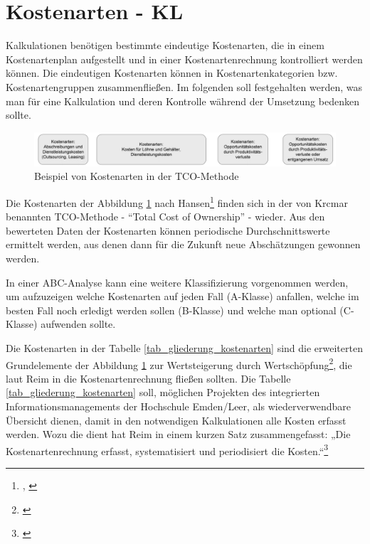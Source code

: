 
\section{Kostenarten - KL}

\label{section_kostenarten}
Kalkulationen benötigen bestimmte eindeutige Kostenarten, die in einem Kostenartenplan aufgestellt und in einer Kostenartenrechnung kontrolliert werden können. Die eindeutigen Kostenarten können in Kostenartenkategorien bzw. Kostenartengruppen zusammenfließen. Im folgenden soll festgehalten werden, was man für eine Kalkulation und deren Kontrolle w\"ahrend der Umsetzung bedenken sollte.

\begin{figure}[h!]
	\centering
	\includegraphics[width=\textwidth]{kapitel/gruppe4_2/bilder/beispiel_kostenarten_TCO}
	\caption{Beispiel von Kostenarten in der TCO-Methode}
	\label{fig_kostenarten_TCO}
\end{figure}

Die Kostenarten der Abbildung \ref{fig_kostenarten_TCO} nach Hansen\footnote{\autocite[495]{hansen_business_2009}, \autocite[Vgl.][314, 355]{muller2013betriebswirtschaftslehre}} finden sich in der von Krcmar benannten TCO-Methode - \enquote{Total Cost of Ownership} - wieder. Aus den bewerteten Daten der Kostenarten können periodische Durchschnittswerte ermittelt werden, aus denen dann für die Zukunft neue Abschätzungen gewonnen werden.

\clearpage

In einer ABC-Analyse kann eine weitere Klassifizierung vorgenommen werden, um aufzuzeigen welche Kostenarten auf jeden Fall (A-Klasse) anfallen, welche im besten Fall noch erledigt werden sollen (B-Klasse) und welche man optional (C-Klasse) aufwenden sollte.

Die Kostenarten in der Tabelle \ref{tab_gliederung_kostenarten} sind die erweiterten Grundelemente der Abbildung \ref{fig_kostenarten_TCO} zur Wertsteigerung durch Wertschöpfung\footnote{\autocite[125-128]{reim_erfolgsrechnung_2015}}, die laut Reim in die Kostenartenrechnung fließen sollten. Die Tabelle \ref{tab_gliederung_kostenarten} soll, m\"oglichen Projekten des integrierten Informationsmanagements der Hochschule Emden/Leer, als wiederverwendbare Übersicht dienen, damit in den notwendigen Kalkulationen alle Kosten erfasst werden. Wozu die dient hat Reim in einem kurzen Satz zusammengefasst: „Die Kostenartenrechnung erfasst, systematisiert und periodisiert die Kosten.“\footnote{\autocite[137-147]{reim_erfolgsrechnung_2015}} 

